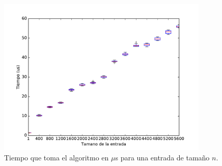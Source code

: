 \begin{figure}[H]
 \centering
	\includegraphics[width=0.9\textwidth]{img/tiempos/genkidama3.pdf}
	\caption{\footnotesize Tiempo que toma el algoritmo en $\mu$s para una entrada de tamaño $n$.}
	\label{fig:genkidama-tiempos3}
\end{figure}
